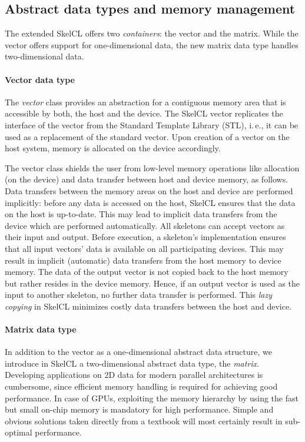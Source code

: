 \subsection{Abstract data types and memory management}
The extended SkelCL offers two \emph{containers}: the vector and the matrix.
While the vector offers support for one-dimensional data, the new matrix data type handles two-dimensional data.

\paragraph{Vector data type}
\label{sec:skelcl:abstract_vector}
The \emph{vector} class provides an abstraction for a contiguous memory area that is accessible by both, the host and the device.
The SkelCL vector replicates the interface of the vector from the Standard Template Library (STL), i.\,e., it can be used as a replacement of the standard vector.
Upon creation of a vector on the host system, memory is allocated on the device accordingly.

The vector class shields the user from low-level memory operations like allocation (on the device) and data transfer between host and device memory, as follows.
Data transfers between the memory areas on the host and device are performed implicitly:
before any data is accessed on the host, SkelCL ensures that the data on the host is up-to-date.
This may lead to implicit data transfers from the device which are performed automatically.
All skeletons can accept vectors as their input and output.
Before execution, a skeleton's implementation ensures that all input vectors' data is available on all participating devices.
This may result in implicit (automatic) data transfers from the host memory to device memory.
The data of the output vector is not copied back to the host memory but rather resides in the device memory.
Hence, if an output vector is used as the input to another skeleton, no further data transfer is performed.
This \emph{lazy copying} in SkelCL minimizes costly data transfers between the host and device.

\paragraph{Matrix data type}
\label{sec:skelcl:matrix}
In addition to the vector as a one-dimensional abstract data structure, we introduce in SkelCL a two-dimensional abstract data type, the \emph{matrix}.
Developing applications on 2D data for modern parallel architectures is cumbersome, since efficient memory handling is required for achieving good performance.
In case of GPUs, exploiting the memory hierarchy by using the fast but small on-chip memory is mandatory for high performance.
Simple and obvious solutions taken directly from a textbook will most certainly result in sub-optimal performance.

